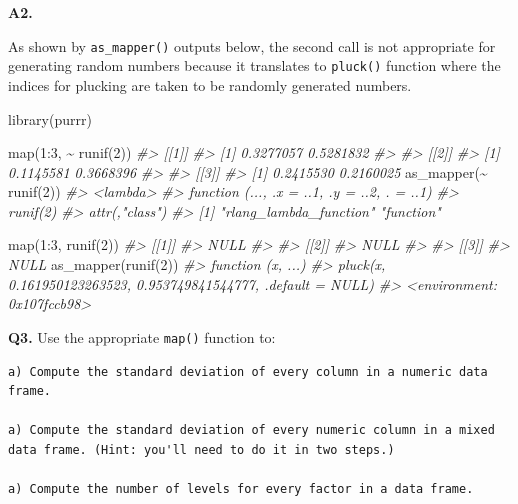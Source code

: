 \documentclass[
]{book}
\newenvironment{Shaded}{\begin{snugshade}}{\end{snugshade}}
\newcommand{\CommentTok}[1]{\textcolor[rgb]{0.56,0.35,0.01}{\textit{#1}}}
\newcommand{\DecValTok}[1]{\textcolor[rgb]{0.00,0.00,0.81}{#1}}
\newcommand{\FunctionTok}[1]{\textcolor[rgb]{0.00,0.00,0.00}{#1}}
\newcommand{\NormalTok}[1]{#1}
\newcommand{\SpecialCharTok}[1]{\textcolor[rgb]{0.00,0.00,0.00}{#1}}
\begin{document}
\textbf{A2.}

As shown by \texttt{as\_mapper()} outputs below, the second call is not appropriate for generating random numbers because it translates to \texttt{pluck()} function where the indices for plucking are taken to be randomly generated numbers.

\begin{Shaded}
\begin{Highlighting}[]
\FunctionTok{library}\NormalTok{(purrr)}

\FunctionTok{map}\NormalTok{(}\DecValTok{1}\SpecialCharTok{:}\DecValTok{3}\NormalTok{, }\SpecialCharTok{\textasciitilde{}} \FunctionTok{runif}\NormalTok{(}\DecValTok{2}\NormalTok{))}
\CommentTok{\#\textgreater{} [[1]]}
\CommentTok{\#\textgreater{} [1] 0.3277057 0.5281832}
\CommentTok{\#\textgreater{} }
\CommentTok{\#\textgreater{} [[2]]}
\CommentTok{\#\textgreater{} [1] 0.1145581 0.3668396}
\CommentTok{\#\textgreater{} }
\CommentTok{\#\textgreater{} [[3]]}
\CommentTok{\#\textgreater{} [1] 0.2415530 0.2160025}
\FunctionTok{as\_mapper}\NormalTok{(}\SpecialCharTok{\textasciitilde{}} \FunctionTok{runif}\NormalTok{(}\DecValTok{2}\NormalTok{))}
\CommentTok{\#\textgreater{} \textless{}lambda\textgreater{}}
\CommentTok{\#\textgreater{} function (..., .x = ..1, .y = ..2, . = ..1) }
\CommentTok{\#\textgreater{} runif(2)}
\CommentTok{\#\textgreater{} attr(,"class")}
\CommentTok{\#\textgreater{} [1] "rlang\_lambda\_function" "function"}

\FunctionTok{map}\NormalTok{(}\DecValTok{1}\SpecialCharTok{:}\DecValTok{3}\NormalTok{, }\FunctionTok{runif}\NormalTok{(}\DecValTok{2}\NormalTok{))}
\CommentTok{\#\textgreater{} [[1]]}
\CommentTok{\#\textgreater{} NULL}
\CommentTok{\#\textgreater{} }
\CommentTok{\#\textgreater{} [[2]]}
\CommentTok{\#\textgreater{} NULL}
\CommentTok{\#\textgreater{} }
\CommentTok{\#\textgreater{} [[3]]}
\CommentTok{\#\textgreater{} NULL}
\FunctionTok{as\_mapper}\NormalTok{(}\FunctionTok{runif}\NormalTok{(}\DecValTok{2}\NormalTok{))}
\CommentTok{\#\textgreater{} function (x, ...) }
\CommentTok{\#\textgreater{} pluck(x, 0.161950123263523, 0.953749841544777, .default = NULL)}
\CommentTok{\#\textgreater{} \textless{}environment: 0x107fccb98\textgreater{}}
\end{Highlighting}
\end{Shaded}

\textbf{Q3.} Use the appropriate \texttt{map()} function to:

\begin{verbatim}
a) Compute the standard deviation of every column in a numeric data frame.

a) Compute the standard deviation of every numeric column in a mixed data frame. (Hint: you'll need to do it in two steps.)

a) Compute the number of levels for every factor in a data frame.
\end{verbatim}
\end{document}
